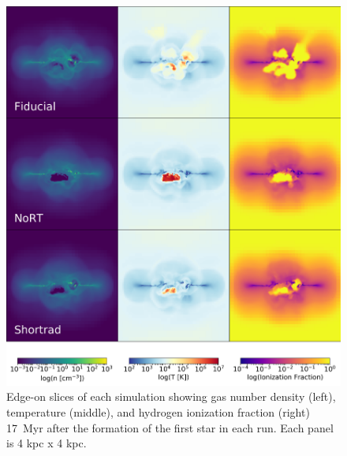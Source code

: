 \documentclass[twocolumn]{aastex62}
\begin{document}
\begin{figure}
\centering
\includegraphics[width=0.99\linewidth]{DD0136_fiducial_shortrad_nort}
\caption{Edge-on slices of each simulation showing gas number density (left), temperature (middle), and hydrogen ionization fraction (right) 17~Myr after the formation of the first star in each run. Each panel is 4 kpc x 4 kpc.}
\label{fig:panel1}
\end{figure}
\end{document}
